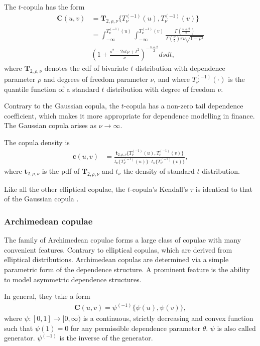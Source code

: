 The $t$-copula has the form
\begin{align*}
        \bm{C}(u,v) &= \bm{T}_{2, \rho, \nu}\{T^{(-1)}_\nu(u), T^{(-1)}_\nu(v)\} \nonumber \\[10pt]
            &= \int_{-\infty}^{T^{(-1)}_\nu(u)}
               \int_{-\infty}^{T^{(-1)}_\nu(v)}
            \frac{\Gamma\left(\frac{\nu+2}{2}\right)}
            {\Gamma\left(\frac{\nu}{2}\right)\pi\nu\sqrt{1-\rho^2}}\\[10pt]
           & \left(
        1+\frac{s^2-2st\rho+t^2}{\nu}
        \right)^{-\frac{\nu+2}{2}} ds dt,
    \end{align*}
where $\bm{T}_{2, \rho, \nu}$ denotes the cdf of
bivariate $t$ distribution with dependence parameter $\rho$ and degrees of freedom parameter $\nu$,
and where $T^{(-1)}_\nu(\cdot)$ is the quantile function of a standard
$t$ distribution with degree of freedom $\nu$. \medskip

Contrary to the Gaussian copula, the $t$-copula has a non-zero
tail dependence coefficient, which makes it more appropriate for
dependence modelling in finance. The Gaussian copula arises as
$\nu\rightarrow\infty$.

The copula density is
\begin{align*}
    \bm{c}(u,v) &= \frac{\bm{t}_{2, \rho, \nu}\{T^{(-1)}_\nu(u), T^{(-1)}_\nu(v)\}}
    {t_\nu\{T^{(-1)}_\nu(u)\}\cdot t_\nu\{T^{(-1)}_\nu(v)\}},
    \end{align*}
where $\bm{t}_{2,\rho, \nu}$ is the pdf of $\bm{T}_{2, \rho, \nu}$
and $t_\nu$ the density of standard $t$ distribution.\medskip

Like all the other elliptical copulae, the $t$-copula's Kendall's
$\tau$ is identical to that of the Gaussian copula \citep[see][and
references therein]{demarta2005t}. 


\subsubsection{Archimedean copulae}\label{sec:archimedean-copula}
The family of Archimedean copulae forms a large class of copulae with
many convenient features.
Contrary to elliptical copulas, which are derived from
elliptical distributions.
Archimedean copulas are determined via a simple parametric form of the dependence structure.
A prominent feature is the ability to model asymmetric dependence structures. \medskip

In general, they take a form
\begin{align*}
    \bm{C}(u,v)= \psi^{(-1)}\{\psi(u), \psi(v)\},
    \end{align*}
where $\psi:[0,1] \rightarrow [0,\infty)$ is a continuous, strictly
decreasing and convex function such that $\psi(1)=0$ for any
permissible dependence parameter $\theta$. $\psi$ is also called
generator. $\psi^{(-1)}$ is the inverse of the generator. \medskip

